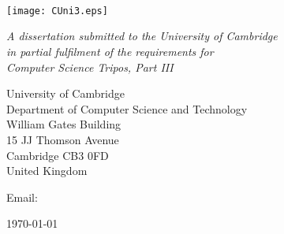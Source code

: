 \begin{titlepage}

\begin{center}
\noindent
\huge
\dissertationtitle \\
\end{center}

\begin{center}
\noindent
\huge
\authorname \\
\Large
\authorcollege      \\[24pt]
\texttt{[image: CUni3.eps]}
\end{center}

\vspace{24pt}

\begin{center}
\noindent
\large
{\it A dissertation submitted to the University of Cambridge \\
in partial fulfilment of the requirements for \\
Computer Science Tripos, Part III}
\end{center}

\begin{center}
\noindent
University of Cambridge \\
Department of Computer Science and Technology \\
William Gates Building  \\
15 JJ Thomson Avenue    \\
Cambridge CB3 0FD       \\
{\sc United Kingdom}    \\
\end{center}

\begin{center}
\noindent
Email: \authoremail \\
\end{center}

\begin{center}
\noindent
\today
\end{center}

\end{titlepage}

\newpage
\vspace*{\fill}
